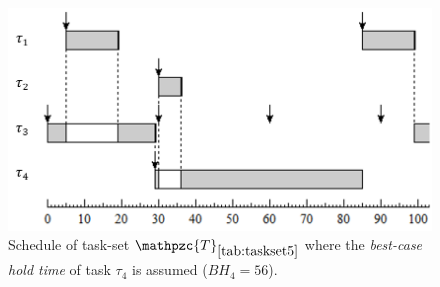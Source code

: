 \documentclass[fleqn]{article}
\begin{document}
\begin{figure}[H]
	\centering
	\includegraphics[width=0.7\linewidth]{figures/bcht_2}
	\caption{Schedule of task-set $\mathpzc{T}_{\ref{tab:taskset5}}$ where the \textit{best-case hold time} of task $\tau_4$ is assumed ($BH_4 = 56$).}
	\label{fig:bcht_2}
\end{figure}



\begin{thebibliography}{10}


	
\end{thebibliography}
\end{document}
